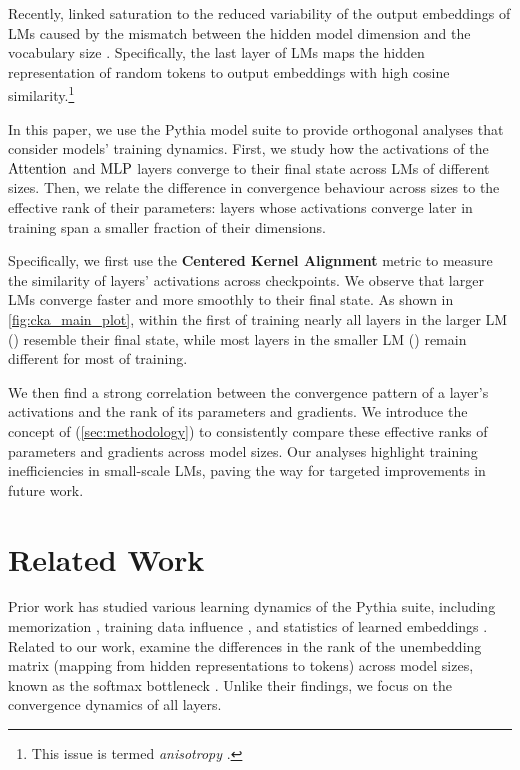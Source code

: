 Recently, \citet{godey2024small} linked saturation to the reduced variability of the output embeddings of LMs caused by the mismatch between the hidden model dimension and the vocabulary size \citep{yang2018breaking}. Specifically, the last layer of LMs maps the hidden representation of random tokens to output embeddings with high cosine similarity.\footnote{This issue is termed \emph{anisotropy} \citep{ethayarajh2019contextual}.}

In this paper, we use the Pythia model suite \citep{biderman2023pythia} to provide orthogonal analyses that consider models' training dynamics.  
First, we study how the activations of the $\mathrm{Attention}$ and $\mathrm{MLP}$ layers converge to their final state across LMs of different sizes. Then, we relate the difference in convergence behaviour across sizes to the effective rank of their parameters: layers whose activations converge later in training span a smaller fraction of their dimensions.

Specifically, we first use the \textbf{Centered Kernel Alignment} \citep[$\cka$;][]{kornblith2019cka} metric to measure the similarity of layers' activations across checkpoints. We observe that larger LMs converge faster and more smoothly to their final state. As shown in \cref{fig:cka_main_plot}, within the first  of training nearly all layers in the larger LM (\twobil) resemble their final state, while most layers in the smaller LM (\sixmil) remain different for most of training.

We then find a strong correlation between the convergence pattern of a layer's activations and the rank of its parameters and gradients. We introduce the concept of  (\cref{sec:methodology}) to consistently compare these effective ranks of parameters and gradients 
across model sizes. Our analyses highlight training inefficiencies in small-scale LMs, paving the way for targeted improvements in future work.


\section{Related Work}\label{sec:related_work}

Prior work has studied various learning dynamics of the Pythia suite, including memorization \citep{biderman2023pythia, lesci2024causal}, training data influence \citep{chai2024training}, and statistics of learned embeddings \citep{belrose2024neural}.
Related to our work, \citet{godey2024small} examine the differences in the rank of the unembedding matrix (mapping from hidden representations to tokens) across model sizes, known as the softmax bottleneck \citep{yang2018breaking}. Unlike their findings, we focus on the convergence dynamics of all layers.

